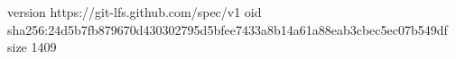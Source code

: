 version https://git-lfs.github.com/spec/v1
oid sha256:24d5b7fb879670d430302795d5bfee7433a8b14a61a88eab3cbec5ec07b549df
size 1409
